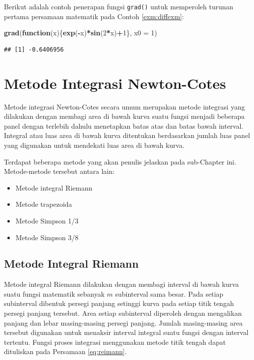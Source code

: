 \documentclass[]{book}
\newenvironment{Shaded}{\begin{snugshade}}{\end{snugshade}}
\newcommand{\ControlFlowTok}[1]{\textcolor[rgb]{0.13,0.29,0.53}{\textbf{#1}}}
\newcommand{\DataTypeTok}[1]{\textcolor[rgb]{0.13,0.29,0.53}{#1}}
\newcommand{\DecValTok}[1]{\textcolor[rgb]{0.00,0.00,0.81}{#1}}
\newcommand{\KeywordTok}[1]{\textcolor[rgb]{0.13,0.29,0.53}{\textbf{#1}}}
\newcommand{\NormalTok}[1]{#1}
\newcommand{\OperatorTok}[1]{\textcolor[rgb]{0.81,0.36,0.00}{\textbf{#1}}}
\providecommand{\tightlist}{%
  \setlength{\itemsep}{0pt}\setlength{\parskip}{0pt}}
\theoremstyle{definition}
\theoremstyle{definition}
\theoremstyle{definition}
\theoremstyle{remark}
\begin{document}
Berikut adalah contoh penerapan fungsi \texttt{grad()} untuk memperoleh turunan pertama persamaan matematik pada Contoh \ref{exm:diffexm}:

\begin{Shaded}
\begin{Highlighting}[]
\KeywordTok{grad}\NormalTok{(}\ControlFlowTok{function}\NormalTok{(x)\{}\KeywordTok{exp}\NormalTok{(}\OperatorTok{-}\NormalTok{x)}\OperatorTok{*}\KeywordTok{sin}\NormalTok{(}\DecValTok{2}\OperatorTok{*}\NormalTok{x)}\OperatorTok{+}\DecValTok{1}\NormalTok{\}, }\DataTypeTok{x0 =} \DecValTok{1}\NormalTok{)}
\end{Highlighting}
\end{Shaded}

\begin{verbatim}
## [1] -0.6406956
\end{verbatim}

\hypertarget{newtoncotes}{%
\section{Metode Integrasi Newton-Cotes}\label{newtoncotes}}

Metode integrasi Newton-Cotes secara umum merupakan metode integrasi yang dilakukan dengan membagi area di bawah kurva suatu fungsi menjadi beberapa panel dengan terlebih dahulu menetapkan batas atas dan batas bawah interval. Integral atau luas area di bawah kurva ditentukan berdasarkan jumlah luas panel yang digunakan untuk mendekati luas area di bawah kurva.

Terdapat beberapa metode yang akan penulis jelaskan pada sub-Chapter ini. Metode-metode tersebut antara lain:

\begin{itemize}
\tightlist
\item
  Metode integral Riemann
\item
  Metode trapezoida
\item
  Metode Simpson 1/3
\item
  Metode Simpson 3/8
\end{itemize}

\hypertarget{riemann}{%
\subsection{Metode Integral Riemann}\label{riemann}}

Metode integral Riemann dilakukan dengan membagi interval di bawah kurva suatu fungsi matematik sebanyak \(m\) subinterval sama besar. Pada setiap subinterval dibentuk persegi panjang setinggi kurva pada setiap titik tengah persegi panjang tersebut. Area setiap subinterval diperoleh dengan mengalikan panjang dan lebar masing-masing persegi panjang. Jumlah masing-masing area tersebut digunakan untuk menaksir interval integral suatu fungsi dengan interval tertentu. Fungsi proses integrasi menggunakan metode titik tengah dapat dituliskan pada Persamaan \eqref{eq:reimann}.
\end{document}
